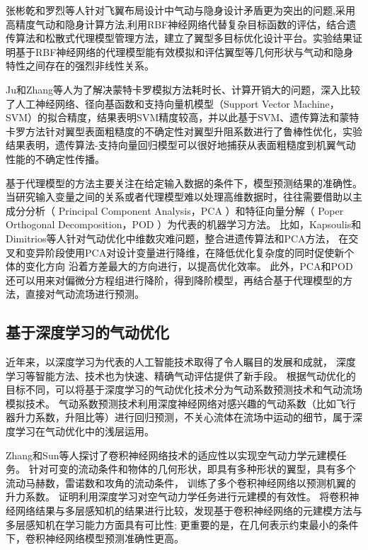 张彬乾和罗烈等人\cite{张罗}针对飞翼布局设计中气动与隐身设计矛盾更为突出的问题,采用高精度气动和隐身计算方法,利用RBF神经网络代替复杂目标函数的评估，结合遗传算法和松散式代理模型管理方法，建立了翼型多目标优化设计平台。实验结果证明基于RBF神经网络的代理模型能有效模拟和评估翼型等几何形状与气动和隐身特性之间存在的强烈非线性关系。

Ju和Zhang等人\cite{Ame}为了解决蒙特卡罗模拟方法耗时长、计算开销大的问题，深入比较了人工神经网络、径向基函数和支持向量机模型（Support Vector Machine，SVM）的拟合精度，结果表明SVM精度较高，并以此基于SVM、遗传算法和蒙特卡罗方法针对翼型表面粗糙度的不确定性对翼型升阻系数进行了鲁棒性优化，实验结果表明，遗传算法-支持向量回归模型可以很好地捕获从表面粗糙度到机翼气动性能的不确定性传播。

基于代理模型的方法主要关注在给定输入数据的条件下，模型预测结果的准确性。
当研究输入变量之间的关系或者代理模型难以处理高维数据时，往往需要借助以主成分分析（ Principal Component Analysis，PCA ）和特征向量分解（ Poper Orthogonal Decomposition，POD ）为代表的机器学习方法。
比如，Kapsoulis和Dimitrios等人\cite{Kapsoulis2018Evolutionary}针对气动优化中维数灾难问题，整合进遗传算法和PCA方法，
在交叉和变异阶段使用PCA对设计变量进行降维，在降低优化复杂度的同时促使新个体的变化方向
沿着方差最大的方向进行，以提高优化效率。
此外，PCA和POD还可以用来对偏微分方程组进行降阶，得到降阶模型，再结合基于代理模型的方法，直接对气动流场进行预测。

\subsection{基于深度学习的气动优化}
近年来，以深度学习为代表的人工智能技术取得了令人瞩目的发展和成就，
深度学习等智能方法、技术也为快速、精确气动评估提供了新手段。
根据气动优化的目标不同，可以将基于深度学习的气动优化技术分为气动系数预测技术和气动流场模拟技术。
气动系数预测技术利用深度神经网络对感兴趣的气动系数（比如飞行器升力系数，升阻比等）进行回归预测，不关心流体在流场中运动的细节，属于深度学习在气动优化中的浅层运用。

Zhang和Sun等人\cite{LiftCoefficient}探讨了卷积神经网络技术的适应性以实现空气动力学元建模任务。
针对可变的流动条件和物体的几何形状，即具有多种形状的翼型，具有多个流动马赫数，雷诺数和攻角的流动条件，
训练了多个卷积神经网络以预测机翼的升力系数。
证明利用深度学习对空气动力学任务进行元建模的有效性。
将卷积神经网络结果与多层感知机的结果进行比较，发现基于卷积神经网络的元建模方法与多层感知机在学习能力方面具有可比性;
更重要的是，在几何表示约束最小的条件下，卷积神经网络模型预测准确性更高。

